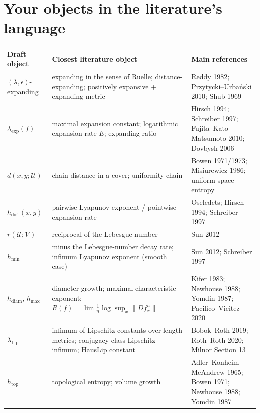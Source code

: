 \documentclass[
]{article}
\newcounter{none} %
\begin{document}
\section{Your objects in the literature's
language}\label{your-objects-in-the-literatures-language}

{\def\LTcaptype{none} %
\begin{longtable}[]{@{}
  >{\raggedright\arraybackslash}p{}
  >{\raggedright\arraybackslash}p{}
  >{\raggedright\arraybackslash}p{}@{}}
\toprule\noalign{}
\begin{minipage}[b]{\linewidth}\raggedright
Draft object
\end{minipage} & \begin{minipage}[b]{\linewidth}\raggedright
Closest literature object
\end{minipage} & \begin{minipage}[b]{\linewidth}\raggedright
Main references
\end{minipage} \\
\midrule\noalign{}
\endhead
\bottomrule\noalign{}
\endlastfoot
\((\lambda,\epsilon)\)-expanding & expanding in the sense of Ruelle;
distance-expanding; positively expansive + expanding metric & Reddy
1982; Przytycki--Urba\'{n}ski 2010; Shub 1969 \\
\(\lambda_{\exp}(f)\) & maximal expansion constant; logarithmic
expansion rate \(E\); expanding ratio & Hirsch 1994; Schreiber 1997;
Fujita--Kato--Matsumoto 2010; Dovbysh 2006 \\
\(d(x,y;\mathcal U)\) & chain distance in a cover; uniformity chain &
Bowen 1971/1973; Misiurewicz 1986; uniform-space entropy \\
\(h_{\mathrm{dist}}(x,y)\) & pairwise Lyapunov exponent / pointwise
expansion rate & Oseledets; Hirsch 1994; Schreiber 1997 \\
\(r(\mathcal U;\mathcal V)\) & reciprocal of the Lebesgue number & Sun
2012 \\
\(h_{\min}\) & minus the Lebesgue-number decay rate; infimum Lyapunov
exponent (smooth case) & Sun 2012; Schreiber 1997 \\
\(h_{\mathrm{diam}}\), \(h_{\max}\) & diameter growth; maximal
characteristic exponent;
\(R(f)=\lim\frac1n\log\sup_x\lVert Df^n_x\rVert\) & Kifer 1983; Newhouse
1988; Yomdin 1987; Pacifico--Vieitez 2020 \\
\(\lambda_{\mathrm{Lip}}\) & infimum of Lipschitz constants over length
metrics; conjugacy-class Lipschitz infimum; HausLip constant &
Bobok--Roth 2019; Roth--Roth 2020; Milnor Section 13 \\
\(h_{\mathrm{top}}\) & topological entropy; volume growth &
Adler--Konheim--McAndrew 1965; Bowen 1971; Newhouse 1988; Yomdin 1987 \\
\end{longtable}
}
\end{document}
